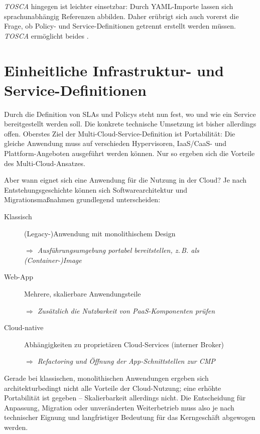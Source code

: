 \emph{TOSCA} hingegen ist leichter einsetzbar: Durch YAML-Importe lassen sich sprachunabhängig Referenzen abbilden. Daher erübrigt sich auch vorerst die Frage, ob Policy- und Service-Definitionen getrennt erstellt werden müssen. \emph{TOSCA} ermöglicht beides \cite{borgi:2014:tosca-intro}.

\section{Einheitliche Infrastruktur- und Service-Definitionen}%

Durch die Definition von SLAs und Policys steht nun fest, wo und wie ein Service bereitgestellt werden soll. Die konkrete technische Umsetzung ist bisher allerdings offen. Oberstes Ziel der Multi-Cloud-Service-Definition ist Portabilität: Die gleiche Anwendung muss auf verschieden Hypervisoren, IaaS/CaaS- und Plattform-Angeboten ausgeführt werden können. Nur so ergeben sich die Vorteile des Multi-Cloud-Ansatzes.

Aber wann eignet sich eine Anwendung für die Nutzung in der Cloud? Je nach Entstehungsgeschichte können sich Softwarearchitektur und Migrationsmaßnahmen grundlegend unterscheiden:

\begin{description}
	
	\item[Klassisch] (Legacy-)Anwendung mit monolithischem Design
	
	\emph{$\Rightarrow$ Ausführungsumgebung portabel bereitstellen, z.\,B. als (Container-)Image}
	
	\item[Web-App] Mehrere, skalierbare Anwendungsteile
	
	\emph{$\Rightarrow$ Zusätzlich die Nutzbarkeit von PaaS-Komponenten prüfen}
	
	\item[Cloud-native] Abhängigkeiten zu proprietären Cloud-Services (interner Broker)
	
	\emph{$\Rightarrow$ Refactoring und Öffnung der App-Schnittstellen zur CMP}
	
\end{description}

\noindent
Gerade bei klassischen, monolithischen Anwendungen ergeben sich architekturbedingt nicht alle Vorteile der Cloud-Nutzung; eine erhöhte Portabilität ist gegeben --  Skalierbarkeit allerdings nicht. Die Entscheidung für Anpassung, Migration oder unveränderten Weiterbetrieb muss also je nach technischer Eignung und langfristiger Bedeutung für das Kerngeschäft abgewogen werden.

